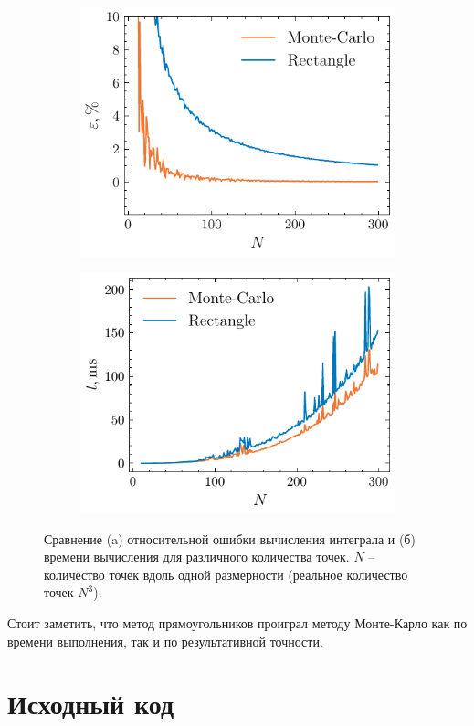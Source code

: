 \begin{figure}[H]
    \centering
    \begin{subfigure}{0.49\linewidth}
        \centering
        \includegraphics[width=1\linewidth]{figs/20/eps}
        \caption{}
        \label{sfig:results:eps}
    \end{subfigure}
    \begin{subfigure}{0.49\linewidth}
        \centering
        \includegraphics[width=1\linewidth]{figs/20/time}
        \caption{}
        \label{sfig:results:time}
    \end{subfigure}
    \caption{Сравнение (a) относительной ошибки вычисления интеграла и (б)
    времени вычисления для различного количества точек. $N$ -- количество точек
вдоль одной размерности (реальное количество точек $N^3$).}
    \label{fig:results}
\end{figure}

Стоит заметить, что метод прямоугольников проиграл методу Монте-Карло как по
времени выполнения, так и по результативной точности. 



\newpage
\section{Исходный код}



